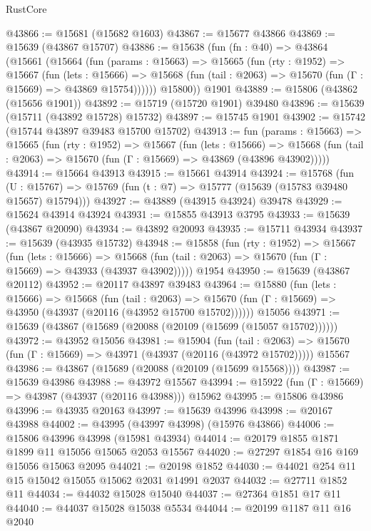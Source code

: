 \begin{lexlean}{RustCore}
\begin{coremodule}
@43866 := @15681 (@15682 @1603)
@43867 := @15677 @43866
@43869 := @15639 (@43867 @15707)
@43886 := @15638
    (fun (fn : @40) =>
    @43864
      (@15661
        (@15664
          (fun (params : @15663) =>
          @15665
            (fun (rty : @1952) =>
            @15667
              (fun (lets : @15666) =>
              @15668 (fun (tail : @2063) => @15670 (fun (Γ : @15669) => @43869 @15754))))))
        @15800))
    @1901
@43889 := @15806 (@43862 (@15656 @1901))
@43892 := @15719 (@15720 @1901) @39480
@43896 := @15639 (@15711 (@43892 @15728) @15732)
@43897 := @15745 @1901
@43902 := @15742 (@15744 @43897 @39483 @15700 @15702)
@43913 := fun (params : @15663) =>
  @15665
    (fun (rty : @1952) =>
    @15667
      (fun (lets : @15666) =>
      @15668 (fun (tail : @2063) => @15670 (fun (Γ : @15669) => @43869 (@43896 @43902)))))
@43914 := @15664 @43913
@43915 := @15661 @43914
@43924 := @15768
    (fun (U : @15767) => @15769 (fun (t : @7) => @15777 (@15639 (@15783 @39480 @15657) @15794)))
@43927 := @43889 (@43915 @43924) @39478
@43929 := @15624 @43914 @43924
@43931 := @15855 @43913 @3795
@43933 := @15639 (@43867 @20090)
@43934 := @43892 @20093
@43935 := @15711 @43934
@43937 := @15639 (@43935 @15732)
@43948 := @15858
    (fun (rty : @1952) =>
    @15667
      (fun (lets : @15666) =>
      @15668 (fun (tail : @2063) => @15670 (fun (Γ : @15669) => @43933 (@43937 @43902)))))
    @1954
@43950 := @15639 (@43867 @20112)
@43952 := @20117 @43897 @39483
@43964 := @15880
    (fun (lets : @15666) =>
    @15668
      (fun (tail : @2063) =>
      @15670 (fun (Γ : @15669) => @43950 (@43937 (@20116 (@43952 @15700 @15702))))))
    @15056
@43971 := @15639 (@43867 (@15689 (@20088 (@20109 (@15699 (@15057 @15702))))))
@43972 := @43952 @15056
@43981 := @15904
    (fun (tail : @2063) => @15670 (fun (Γ : @15669) => @43971 (@43937 (@20116 (@43972 @15702)))))
    @15567
@43986 := @43867 (@15689 (@20088 (@20109 (@15699 @15568))))
@43987 := @15639 @43986
@43988 := @43972 @15567
@43994 := @15922 (fun (Γ : @15669) => @43987 (@43937 (@20116 @43988))) @15962
@43995 := @15806 @43986
@43996 := @43935 @20163
@43997 := @15639 @43996
@43998 := @20167 @43988
@44002 := @43995 (@43997 @43998) (@15976 @43866)
@44006 := @15806 @43996 @43998 (@15981 @43934)
@44014 := @20179 @1855 @1871 @1899 @11 @15056 @15065 @2053 @15567
@44020 := @27297 @1854 @16 @169 @15056 @15063 @2095
@44021 := @20198 @1852
@44030 := @44021 @254 @11 @15 @15042 @15055 @15062 @2031 @14991 @2037
@44032 := @27711 @1852 @11
@44034 := @44032 @15028 @15040
@44037 := @27364 @1851 @17 @11
@44040 := @44037 @15028 @15038 @5534
@44044 := @20199 @1187 @11 @16 @2040

\end{coremodule}
\end{lexlean}
